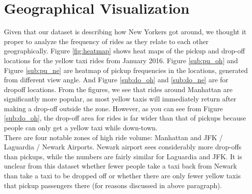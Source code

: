 \documentclass{article}
\begin{document}
\section{Geographical Visualization}
Given that our dataset is describing how New Yorkers got around, we thought it proper to analyze the frequency of rides as they relate to each other geographically. Figure \ref{fig:heatmap} shows heat maps of the pickup and drop-off locations for the yellow taxi rides from January 2016. Figure \ref{sub:pu_oh} and Figure \ref{sub:pu_ne} are heatmap of pickup frequencies in the locations, generated from different view angle. And Figure \ref{sub:do_oh} and \ref{sub:do_ne} are for dropoff locations. From the figures, we see that rides around Manhattan are significantly more popular, as most yellow taxis will immediately return after making a drop-off outside the zone. However, as you can see from Figure \ref{sub:do_oh}, the drop-off area for rides is far wider than that of pickups because people can only get a yellow taxi while down-town. \\

There are four notable zones of high ride volume: Manhattan and JFK / Laguardia / Newark Airports. Newark airport sees considerably more drop-offs than pickups, while the numbers are fairly similar for Laguardia and JFK. It is unclear from this dataset whether fewer people take a taxi back from Newark than take a taxi to be dropped off or whether there are only fewer yellow taxis that pickup passengers there (for reasons discussed in above paragraph). 
\end{document}
